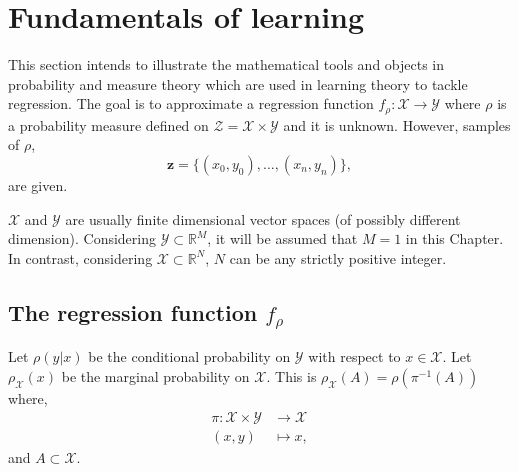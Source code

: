 
\section{Fundamentals of learning} \label{sec_FundamentalsLearning}

This section intends to illustrate the mathematical tools and objects in probability and measure theory which are used in learning theory to tackle regression. The goal is to approximate a regression function $f_{\rho} : \mathcal{X} \to \mathcal{Y}$ where $\rho$ is a probability measure defined on $\mathcal{Z}=\mathcal{X} \times \mathcal{Y}$ and it is unknown. However, samples of $\rho$, 
\begin{equation*}
  \pmb{z} = \{(x_0,y_0), \dots, (x_n,y_n)\}, 
\end{equation*}
are given. 

$\mathcal{X}$ and $\mathcal{Y}$ are usually finite dimensional vector spaces (of possibly different dimension). Considering $\mathcal{Y} \subset \mathbb{R}^M$, it will be assumed that $M=1$ in this Chapter. %
In contrast, considering $\mathcal{X} \subset \mathbb{R}^N$, $N$ can be any strictly positive integer.

\subsection{The regression function $f_{\rho}$ } \label{sec_regressionFunction}

Let $\rho(y|x)$ be the conditional probability on $\mathcal{Y}$ with respect to $x \in \mathcal{X}$. Let $\rho_{\mathcal{X}}(x)$ be the marginal probability on $\mathcal{X}$. This is $\rho_{\mathcal{X}}(A) = \rho(\pi^{-1}(A))$ where,
\begin{align*}
\pi \colon \mathcal{X}\times \mathcal{Y} &\to \mathcal{X}\\
(x,y) & \mapsto x,
\end{align*}
and $A \subset \mathcal{X}$.

